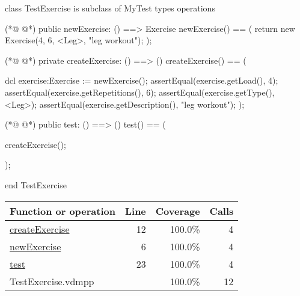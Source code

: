 \begin{vdmpp}[breaklines=true]
class TestExercise is subclass of MyTest
types
operations
 
 
(*@
\label{newExercise:6}
@*)
  public newExercise: () ==> Exercise
 newExercise() == (
  return new Exercise(4, 6, <Leg>, "leg workout");
 );
 
 
(*@
\label{createExercise:12}
@*)
 private createExercise: () ==> ()
 createExercise() == (
    
    dcl exercise:Exercise  := newExercise();
    assertEqual(exercise.getLoad(), 4);
    assertEqual(exercise.getRepetitions(), 6);
    assertEqual(exercise.getType(), <Leg>);
    assertEqual(exercise.getDescription(), "leg workout");
 );
 
 
(*@
\label{test:23}
@*)
 public test: () ==> ()
 test() == (
  
   createExercise();
 
 );

 
end TestExercise
\end{vdmpp}
\bigskip
\begin{longtable}{|l|r|r|r|}
\hline
Function or operation & Line & Coverage & Calls \\
\hline
\hline
\hyperref[createExercise:12]{createExercise} & 12&100.0\% & 4 \\
\hline
\hyperref[newExercise:6]{newExercise} & 6&100.0\% & 4 \\
\hline
\hyperref[test:23]{test} & 23&100.0\% & 4 \\
\hline
\hline
TestExercise.vdmpp & & 100.0\% & 12 \\
\hline
\end{longtable}

